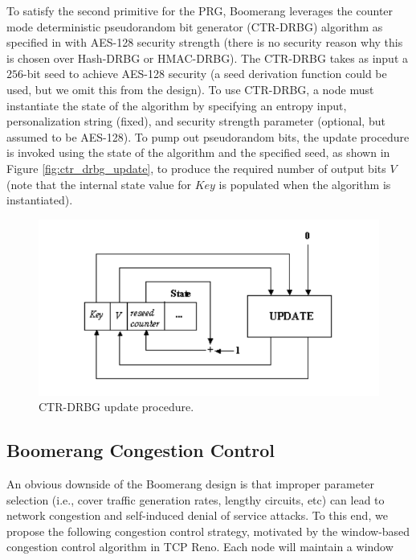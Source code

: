 To satisfy the second primitive for the PRG, Boomerang leverages the counter mode deterministic pseudorandom bit generator (CTR-DRBG) algorithm as specified in \cite{nist-prng} with AES-128 security strength (there is no security reason why this is chosen over Hash-DRBG or HMAC-DRBG). The CTR-DRBG takes as input a $256$-bit seed to achieve AES-128 security (a seed derivation function could be used, but we omit this from the design). To use CTR-DRBG, a node must instantiate the state of the algorithm by specifying an entropy input, personalization string (fixed), and security strength parameter (optional, but assumed to be AES-128). To pump out pseudorandom bits, the update procedure is invoked using the state of the algorithm and the specified seed, as shown in Figure \ref{fig:ctr_drbg_update}, to produce the required number of output bits $V$ (note that the internal state value for $Key$ is populated when the algorithm is instantiated). 

\begin{figure}[ht!]
\begin{center}
\includegraphics[scale=0.35]{./images/ctr_drbg_update.png}
\caption{CTR-DRBG update procedure.}
\label{fig:boomerang_message}
\end{center}
\end{figure}

\subsection{Boomerang Congestion Control}
An obvious downside of the Boomerang design is that improper parameter selection (i.e., cover traffic generation rates, lengthy circuits, etc) can lead to network congestion and self-induced denial of service attacks. To this end, we propose the following congestion control strategy, motivated by the window-based congestion control algorithm in TCP Reno. Each node will maintain a window 

